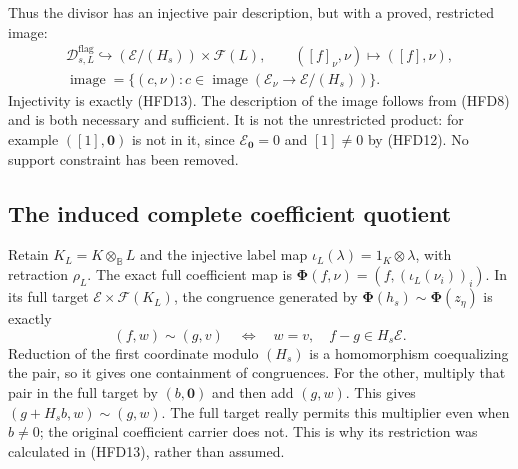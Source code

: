 Thus the divisor has an injective pair description,
but with a proved, restricted image:
\begin{equation}\tag{HFD14}
 \begin{gathered}
 \mathcal D^{\mathrm{flag}}_{s,L}
      \hookrightarrow(\mathcal E/(H_s))\times\mathcal F(L),
       \qquad([f]_\nu,\nu)\longmapsto([f],\nu),\\
 \operatorname{image}
   =\{(c,\nu):c\in\operatorname{image}
                   (\mathcal E_\nu\to\mathcal E/(H_s))\}.
 \end{gathered}
\end{equation}
Injectivity is exactly (HFD13).
The description of the image follows from (HFD8)
and is both necessary and sufficient.
It is not the unrestricted product: for example
$([1],\mathbf0)$ is not in it, since
$\mathcal E_{\mathbf0}=0$ and $[1]\ne0$ by
(HFD12). No support constraint has been removed.

\subsection{The induced complete coefficient quotient}

Retain $K_L=K\otimes_{\mathbb B}L$ and the
injective label map $\iota_L(\lambda)=1_K\otimes\lambda$,
with retraction $\rho_L$.
The exact full coefficient map is
$\boldsymbol\Phi(f,\nu)
   =(f,(\iota_L(\nu_i))_i)$.
In its full target
$\mathcal E\times\mathcal F(K_L)$, the congruence
generated by $\boldsymbol\Phi(h_s)\sim
\boldsymbol\Phi(z_\eta)$ is exactly
\begin{equation}\tag{HFD15}
 (f,w)\sim(g,v)
   \quad\Longleftrightarrow\quad
   w=v,\quad f-g\in H_s\mathcal E .
\end{equation}
Reduction of the first coordinate modulo $(H_s)$
is a homomorphism coequalizing the pair, so
it gives one containment of congruences.
For the other, multiply that pair in the full
target by $(b,\mathbf0)$ and then add $(g,w)$.
This gives $(g+H_sb,w)\sim(g,w)$.
The full target really permits this multiplier
even when $b\ne0$; the original coefficient
carrier does not. This is why its restriction
was calculated in (HFD13), rather than assumed.

